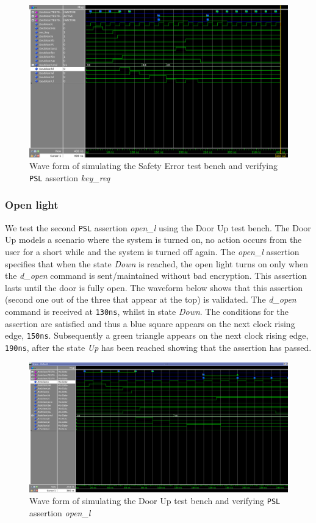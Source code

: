 \documentclass[a4paper,11pt]{article}
\begin{document}
    \begin{figure}[H]
      \centering
      \includegraphics[width=0.9\linewidth]{PSL1assertion_model_SafetyError.png}  
      \caption{Wave form of simulating the Safety Error test bench and verifying \texttt{PSL} assertion \textit{key\_req}}
    \end{figure}
    
    \subsubsection{Open light}
    We test the second \texttt{PSL} assertion \textit{open\_l} using the Door Up test bench. The Door Up models a scenario where the system is turned on, no action occurs from the user for a short while and the system is turned off again. The \textit{open\_l} assertion specifies that when the state \textit{Down} is reached, the open light turns on only when the \textit{d\_open} command is sent/maintained without bad encryption. This assertion lasts until the door is fully open. The waveform below shows that this assertion (second one out of the three that appear at the top) is validated. The \textit{d\_open} command is received at \texttt{130ns}, whilst in state \textit{Down}. The conditions for the assertion are satisfied and thus a blue square appears on the next clock rising edge, \texttt{150ns}. Subsequently a green triangle appears on the next clock rising edge, \texttt{190ns}, after the state \textit{Up} has been reached showing that the assertion has passed.
    
    \begin{figure}[H]
      \centering
      \includegraphics[width=0.9\linewidth]{PSL2assertion_model_DoorUp.png}  
      \caption{Wave form of simulating the Door Up test bench and verifying \texttt{PSL} assertion \textit{open\_l}}
    \end{figure}
    
\end{document}
